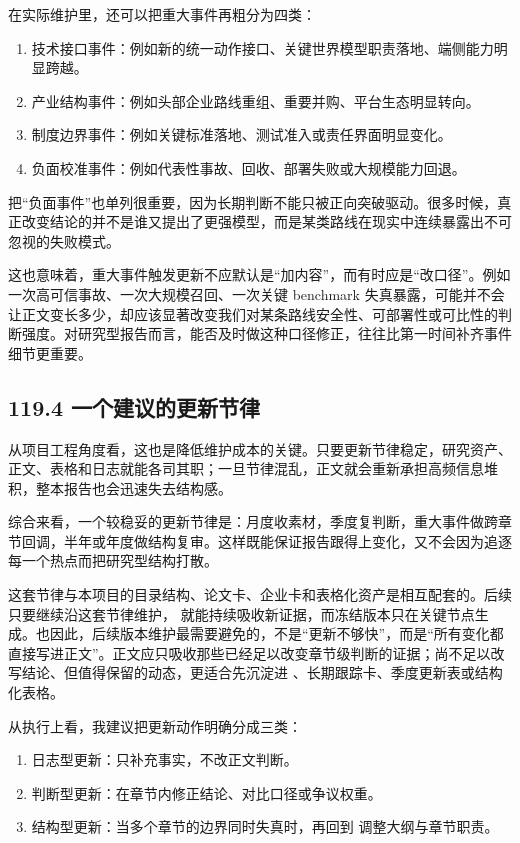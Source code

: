 在实际维护里，还可以把重大事件再粗分为四类：

\begin{enumerate}
\item 技术接口事件：例如新的统一动作接口、关键世界模型职责落地、端侧能力明显跨越。
\item 产业结构事件：例如头部企业路线重组、重要并购、平台生态明显转向。
\item 制度边界事件：例如关键标准落地、测试准入或责任界面明显变化。
\item 负面校准事件：例如代表性事故、回收、部署失败或大规模能力回退。
\end{enumerate}

把“负面事件”也单列很重要，因为长期判断不能只被正向突破驱动。很多时候，真正改变结论的并不是谁又提出了更强模型，而是某类路线在现实中连续暴露出不可忽视的失败模式。

这也意味着，重大事件触发更新不应默认是“加内容”，而有时应是“改口径”。例如一次高可信事故、一次大规模召回、一次关键 benchmark 失真暴露，可能并不会让正文变长多少，却应该显著改变我们对某条路线安全性、可部署性或可比性的判断强度。对研究型报告而言，能否及时做这种口径修正，往往比第一时间补齐事件细节更重要。

\subsection*{119.4 一个建议的更新节律}


从项目工程角度看，这也是降低维护成本的关键。只要更新节律稳定，研究资产、正文、表格和日志就能各司其职；一旦节律混乱，正文就会重新承担高频信息堆积，整本报告也会迅速失去结构感。

综合来看，一个较稳妥的更新节律是：月度收素材，季度复判断，重大事件做跨章节回调，半年或年度做结构复审。这样既能保证报告跟得上变化，又不会因为追逐每一个热点而把研究型结构打散。

这套节律与本项目的目录结构、论文卡、企业卡和表格化资产是相互配套的。后续只要继续沿这套节律维护，\texttt{} 就能持续吸收新证据，而冻结版本只在关键节点生成。也因此，后续版本维护最需要避免的，不是“更新不够快”，而是“所有变化都直接写进正文”。正文应只吸收那些已经足以改变章节级判断的证据；尚不足以改写结论、但值得保留的动态，更适合先沉淀进 、长期跟踪卡、季度更新表或结构化表格。

从执行上看，我建议把更新动作明确分成三类：

\begin{enumerate}
\item 日志型更新：只补充事实，不改正文判断。
\item 判断型更新：在章节内修正结论、对比口径或争议权重。
\item 结构型更新：当多个章节的边界同时失真时，再回到  调整大纲与章节职责。
\end{enumerate}

